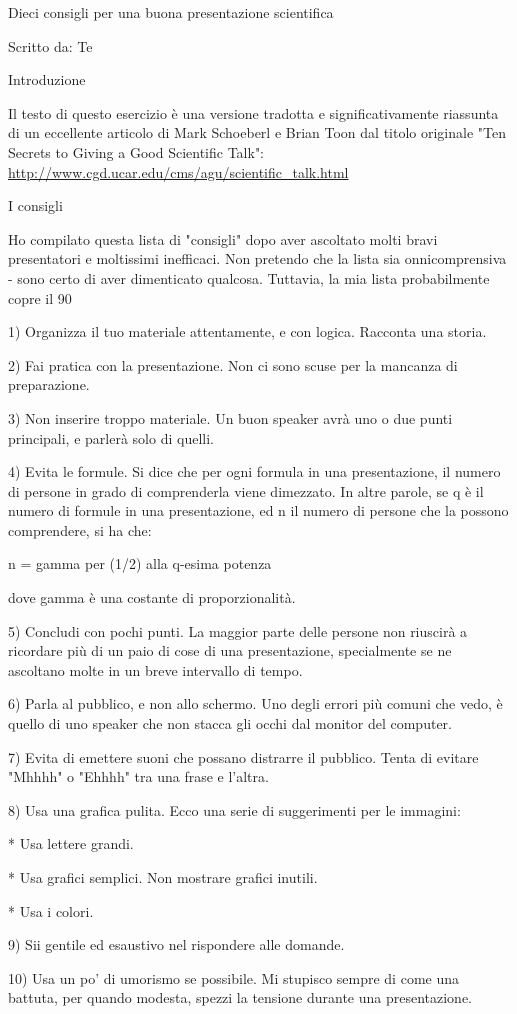 \documentclass[12pt]{article}
\begin{document}
Dieci consigli per una buona presentazione scientifica

Scritto da: Te

Introduzione

Il testo di questo esercizio è una versione tradotta e significativamente riassunta di un eccellente articolo di Mark Schoeberl e Brian Toon dal titolo originale "Ten Secrets to Giving a Good Scientific Talk": 
\url{http://www.cgd.ucar.edu/cms/agu/scientific_talk.html}

I consigli

Ho compilato questa lista di "consigli" dopo aver ascoltato molti bravi presentatori e moltissimi inefficaci. Non pretendo che la lista sia onnicomprensiva - sono certo di aver dimenticato qualcosa. Tuttavia, la mia lista probabilmente copre il 90%

1) Organizza il tuo materiale attentamente, e con logica. Racconta una storia.

2) Fai pratica con la presentazione. Non ci sono scuse per la mancanza di preparazione.

3) Non inserire troppo materiale. Un buon speaker avrà uno o due punti principali, e parlerà solo di quelli.

4) Evita le formule. Si dice che per ogni formula in una presentazione, il numero di persone in grado di comprenderla viene dimezzato. In altre parole, se q è il numero di formule in una presentazione, ed n il numero di persone che la possono comprendere, si ha che:

n = gamma per (1/2) alla q-esima potenza

dove gamma è una costante di proporzionalità.

5) Concludi con pochi punti. La maggior parte delle persone non riuscirà a ricordare più di un paio di cose di una presentazione, specialmente se ne ascoltano molte in un breve intervallo di tempo.

6) Parla al pubblico, e non allo schermo. Uno degli errori più comuni che vedo, è quello di uno speaker che non stacca gli occhi dal monitor del computer.

7) Evita di emettere suoni che possano distrarre il pubblico. Tenta di evitare "Mhhhh" o "Ehhhh" tra una frase e l'altra.

8) Usa una grafica pulita. Ecco una serie di suggerimenti per le immagini:

* Usa lettere grandi.

* Usa grafici semplici. Non mostrare grafici inutili.

* Usa i colori.

9) Sii gentile ed esaustivo nel rispondere alle domande.

10) Usa un po' di umorismo se possibile. Mi stupisco sempre di come una battuta, per quando modesta, spezzi la tensione durante una presentazione.
\end{document}
